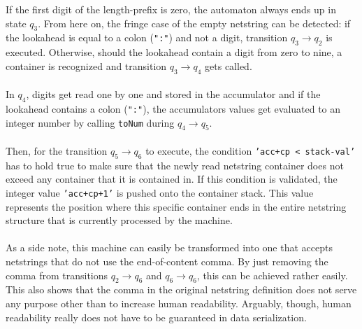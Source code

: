 If the first digit of the length-prefix is zero, the automaton always ends up in state $q_3$. From here on, the fringe case of the empty netstring can be detected: if the lookahead is equal to a colon (\texttt{":"}) and not a digit, transition $q_3 \rightarrow q_2$ is executed. Otherwise, should the lookahead contain a digit from zero to nine, a container is recognized and transition $q_3 \rightarrow q_4$ gets called.\\\\
In $q_4$, digits get read one by one and stored in the accumulator and if the lookahead contains a colon (\texttt{":"}), the accumulators values get evaluated to an integer number by calling \texttt{toNum} during $q_4 \rightarrow q_5$.\\\\
Then, for the transition $q_5 \rightarrow q_6$ to execute, the condition \texttt{'acc+cp < stack-val'} has to hold true to make sure that the newly read netstring container does not exceed any container that it is contained in. If this condition is validated, the integer value \texttt{'acc+cp+1'} is pushed onto the container stack. This value represents the position where this specific container ends in the entire netstring structure that is currently processed by the machine.\\\\
As a side note, this machine can easily be transformed into one that accepts netstrings that do not use the end-of-content comma. By just removing the comma from transitions $q_2 \rightarrow q_6$ and $q_6 \rightarrow q_6$, this can be achieved rather easily. This also shows that the comma in the original netstring definition does not serve any purpose other than to increase human readability. Arguably, though, human readability really does not have to be guaranteed in data serialization.


